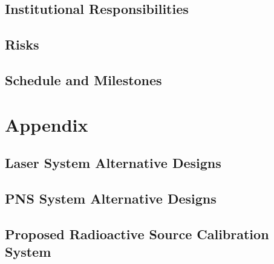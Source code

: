 \subsection{Institutional Responsibilities}
\label{sec:sp-calib-resp}


%

\subsection{Risks}
\label{sec:sp-calib-risks}


\subsection{Schedule and Milestones}
\label{sec:sp-calib-sched}



\newpage

\section{Appendix}
\subsection{Laser System Alternative Designs}
\label{sec:sp-calib-laser-alter}


\subsection{PNS System Alternative Designs}
\label{sec:sp-calib-pns-alter}


\subsection{Proposed Radioactive Source Calibration System}
\label{sec:sp-calib-sys-rsds}


